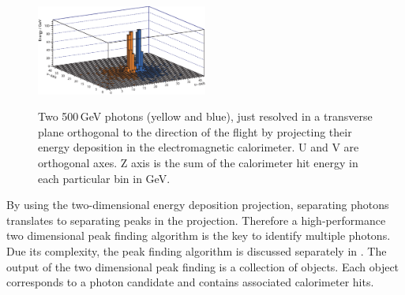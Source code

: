 


\begin{figure}[tbph]
\centering
{\includegraphics[width=0.5\textwidth]{photon/peakFindingMod}}
\caption[Example of a projection of a large photon clusters containing two photons.]
{Two 500\,GeV photons (yellow and blue), just resolved in a transverse plane orthogonal to the direction of the flight  by projecting their energy deposition in the electromagnetic calorimeter. U and V are orthogonal axes. Z axis is the sum of the calorimeter hit energy in each particular bin in GeV.}
\label{fig:photonPeakFinding}
\end{figure}

By using the two-dimensional energy deposition projection, separating photons translates to separating peaks in the projection. Therefore a high-performance two dimensional peak finding algorithm is the key to identify multiple photons. Due its complexity, the peak finding algorithm is discussed separately in . The output of the two dimensional peak finding is a collection of \ShowerPeak objects. Each \ShowerPeak object corresponds to a photon candidate and contains associated calorimeter hits.

